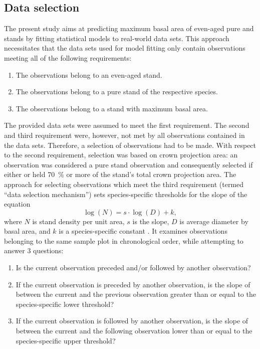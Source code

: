 \subsection{Data selection}
The present study aims at predicting maximum basal area of even-aged pure \Beech{} and \Spruce{} stands by fitting statistical models to real-world data sets.  This approach necessitates that the data sets used for model fitting only contain observations meeting all of the following requirements:
\begin{enumerate}
\item The observations belong to an even-aged stand.
\item The observations belong to a pure stand of the respective species.
\item The observations belong to a stand with maximum basal area.
\end{enumerate}
The provided data sets were assumed to meet the first requirement.  The second and third requirement were, however, not met by all observations contained in the data sets.  Therefore, a selection of observations had to be made.  With respect to the second requirement, selection was based on crown projection area: an observation was considered a pure stand observation and consequently selected if either \Beech{} or \Spruce{} held \SI{70}{\percent} or more of the stand’s total crown projection area.  The approach for selecting observations which meet the third requirement (termed ``data selection mechanism'') sets species-specific thresholds for the slope of the equation
\begin{equation}
  \label{eq:Reineke}
  \log (N) = s \cdot \log (D) + k ,
\end{equation}
where \(N\) is stand density per unit area, \(s\) is the slope, \(D\) is average diameter by basal area, and \(k\) is a species-specific constant \parencite{Reineke1933}.  It examines observations belonging to the same sample plot in chronological order, while attempting to answer 3 questions:
\begin{enumerate}
\item Is the current observation preceded and/or followed by another observation?
\item If the current observation is preceded by another observation, is the slope of  between the current and the previous observation greater than or equal to the species-specific lower threshold?
\item If the current observation is followed by another observation, is the slope of  between the current and the following observation lower than or equal to the species-specific upper threshold?
\end{enumerate}
